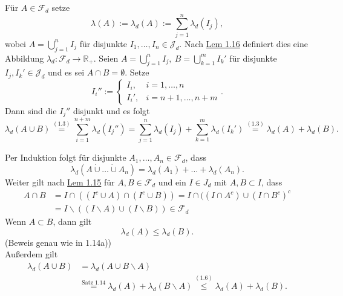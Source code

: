 \documentclass[a4paper]{report}
\newcommand{\R}{\mathbb{R}}
\newcommand{\Fd}{\mathcal{F}_d}
\newcommand{\Jd}{\mathcal{J}_d}
\newcommand{\dcup}{\dot{\cup}}
\newcommand{\jlabel}[1]{\label{j_#1}}
\newcommand{\jshortlink}[1]{\jhyperref{#1}{\text{#1}}}
\newcommand{\jhyperref}[2]{\hyperref[j_#1]{#2}}
\newcommand{\jlink}[1]{\jhyperref{#1}{#1}}
\theoremstyle{plain}
\theoremstyle{definition}
\begin{document}
{{{Für $A\in\Fd$ setze
\jlabel{(1.3)}
\begin{equation}
    \lambda(A) := \lambda_d(A) := \sum_{j=1}^n \lambda_d(I_j),
\end{equation} 
wobei $A = \bigcup_{j=1}^n I_j$ für disjunkte $I_1, \dots, I_n \in \Jd$. Nach \jlink{Lem 1.16} definiert dies eine Abbildung $\lambda_d : \Fd \rightarrow \R_+$. Seien $A=\bigcup_{j=1}^n I_j, \ B = \bigcup_{k=1}^m I_k'$ für disjunkte $I_j, I_k' \in \Jd$ und es sei $A\cap B = \emptyset$. Setze
\begin{displaymath}
    I_i'' := \begin{cases} I_i, & i=1,\dots,n\\ I_i', &i = n+1,\dots,n+m\end{cases}.
\end{displaymath}
Dann sind die $I_j''$ disjunkt und es folgt
\begin{displaymath}
    \lambda_d(A \cup B) \overset{\jlink{(1.3)}}{=} \sum_{i=1}^{n+m} \lambda_d(I_j'') = \sum_{j=1}^n \lambda_d(I_j) + \sum_{k=1}^m \lambda_d(I_k') \overset{\jlink{(1.3)}}{=} \lambda_d(A) + \lambda_d(B).
\end{displaymath}

Per Induktion folgt für disjunkte $A_1,\dots,A_n \in \Fd$, dass
\jlabel{(1.4)}
\begin{equation}
    \lambda_d(A \dcup \dots \dcup A_n) = \lambda_d(A_1) + \dots + \lambda_d(A_n).
\end{equation}
Weiter gilt nach \jlink{Lem 1.15} für $A,B\in\Fd$ und ein $I \in J_d$ mit $A,B \subset I$, dass
\jlabel{(1.5)}
\begin{equation}
    \begin{split}
        A\cap B &= I\cap((I^c\cup A)\cap (I^c\cup B)) = I\cap ((I\cap A^c)\cup(I\cap B^c)^c \\
                &= I\backslash ((I\backslash A) \cup (I\backslash B)) \in \Fd
    \end{split}
\end{equation}
Wenn $A\subset B$, dann gilt
\jlabel{(1.6)}
\begin{equation}
    \lambda_d(A) \le \lambda_d(B).
\end{equation}
(Beweis genau wie in 1.14a)) \\
Außerdem gilt
\jlabel{(1.7)}
\begin{equation}
    \begin{split}
        \lambda_d(A\cup B) &= \lambda_d(A\cup B \backslash A)\\
        &\overset{\jshortlink{Satz 1.14}}{=} \lambda_d(A) + \lambda_d(B\backslash A) \overset{\jlink{(1.6)}}{\le} \lambda_d(A) + \lambda_d(B).
    \end{split}
\end{equation}

}}}
\end{document}
